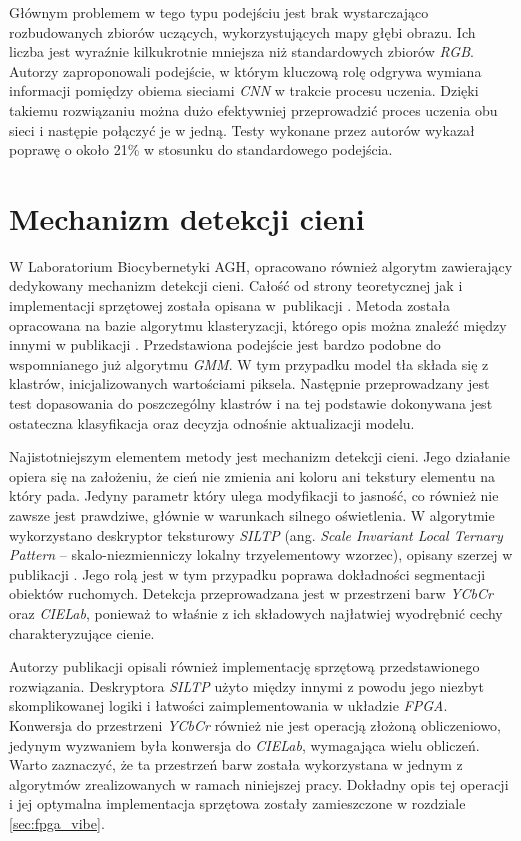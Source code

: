 Głównym problemem w tego typu podejściu jest brak wystarczająco rozbudowanych zbiorów uczących, wykorzystujących mapy głębi obrazu. 
Ich liczba jest wyraźnie kilkukrotnie mniejsza niż standardowych zbiorów \textit{RGB}. 
Autorzy zaproponowali podejście, w którym kluczową rolę odgrywa wymiana informacji pomiędzy obiema sieciami \textit{CNN} w trakcie procesu uczenia. 
Dzięki takiemu rozwiązaniu można dużo efektywniej przeprowadzić proces uczenia obu sieci i następie połączyć je w jedną. 
Testy wykonane przez autorów wykazał poprawę o około \num{21}\% w stosunku do standardowego podejścia.

\section{Mechanizm detekcji cieni}
\label{sec:cienie}

W Laboratorium Biocybernetyki AGH, opracowano również algorytm zawierający dedykowany mechanizm detekcji cieni. 
Całość od strony teoretycznej jak i implementacji sprzętowej została opisana w~publikacji \cite{kryjak_11_shadows}. 
Metoda została opracowana na bazie algorytmu klasteryzacji, którego opis można znaleźć między innymi w publikacji \cite{butler_03}. 
Przedstawiona podejście jest bardzo podobne do wspomnianego już algorytmu \textit{GMM}. 
W tym przypadku model tła składa się z klastrów, inicjalizowanych wartościami piksela. 
Następnie przeprowadzany jest test dopasowania do poszczególny klastrów i na tej podstawie dokonywana jest ostateczna klasyfikacja oraz decyzja odnośnie aktualizacji modelu.

Najistotniejszym elementem metody jest mechanizm detekcji cieni. 
Jego działanie opiera się na założeniu, że cień nie zmienia ani koloru ani tekstury elementu na który pada. 
Jedyny parametr który ulega modyfikacji to jasność, co również nie zawsze jest prawdziwe, głównie w warunkach silnego oświetlenia. 
W algorytmie wykorzystano deskryptor teksturowy \textit{SILTP} (ang. \textit{Scale Invariant Local Ternary
Pattern} -- skalo-niezmienniczy lokalny trzyelementowy wzorzec), opisany szerzej w publikacji \cite{qin_10}.  %
Jego rolą jest w tym przypadku poprawa dokładności segmentacji obiektów ruchomych. 
Detekcja przeprowadzana jest w przestrzeni barw \textit{YCbCr} oraz \textit{CIELab}, ponieważ to właśnie z ich składowych najłatwiej wyodrębnić cechy charakteryzujące cienie.

Autorzy publikacji \cite{kryjak_11_shadows} opisali również implementację sprzętową przedstawionego rozwiązania. 
Deskryptora \textit{SILTP} użyto między innymi z powodu jego niezbyt skomplikowanej logiki i łatwości zaimplementowania w układzie \textit{FPGA}. 
Konwersja do przestrzeni \textit{YCbCr} również nie jest operacją złożoną obliczeniowo, jedynym wyzwaniem była konwersja do \textit{CIELab}, wymagająca wielu obliczeń. 
Warto zaznaczyć, że ta przestrzeń barw została wykorzystana w jednym z algorytmów zrealizowanych w ramach niniejszej pracy. 
Dokładny opis tej operacji i jej optymalna implementacja sprzętowa zostały zamieszczone w rozdziale \ref{sec:fpga_vibe}. 

